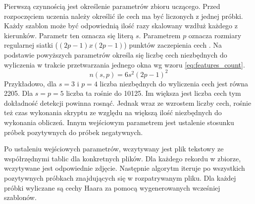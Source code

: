 \FloatBarrier
Pierwszą czynnością jest określenie parametrów zbioru uczącego.
Przed rozpoczęciem uczenia należy określić ile cech ma być liczonych z jednej próbki.
Każdy szablon może być odpowiednią ilość razy skalowany wzdłuż każdego z kierunków.
Parametr ten oznacza się literą $s$.
Parametrem $p$ oznacza rozmiary regularnej siatki ($(2p-1)x(2p-1)$) punktów zaczepienia cech \cite{szybka_detekcja_klesk}.
Na podstawie powyższych parametrów określa się liczbę cech niezbędnych do wyliczenia w trakcie przetwarzania jednego okna wg wzoru \ref{eq:features_count}.
\begin{equation}
    \label{eq:features_count}
    n(s,p)=6s^2(2p-1)^2
\end{equation}
Przykładowo, dla $s=3$ i $p=4$ liczba niezbędnych do wyliczenia cech jest równa 2205.
Dla $s=p=5$ liczba ta rośnie do 10125.
Im większa jest liczba cech tym dokładność detekcji powinna rosnąć.
Jednak wraz ze wzrostem liczby cech, rośnie też czas wykonania skryptu ze względu na większą ilość niezbędnych do wykonania obliczeń.
Innym wejściowym parametrem jest ustalenie stosunku próbek pozytywnych do próbek negatywnych.

Po ustaleniu wejściowych parametrów, wczytywany jest plik tekstowy ze współrzędnymi tablic dla konkretnych plików.
Dla każdego rekordu w zbiorze, wczytywane jest odpowiednie zdjęcie.
Następnie algorytm iteruje po wszystkich pozytywnych próbkach znajdujących się w rozpatrywanym pliku.
Dla każdej próbki wyliczane są cechy Haara za pomocą wygenerowanych wcześniej szablonów.

